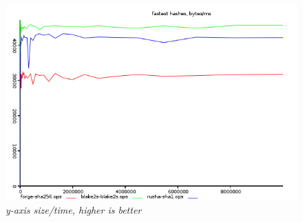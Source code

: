\begin{figure}
\centering
\includegraphics[scale=0.6]{graphs/hash-ops-best.png}
\caption{\small \sl y-axis size/time, higher is better
\label{fig:hash-ops-best}}
\end{figure} 

